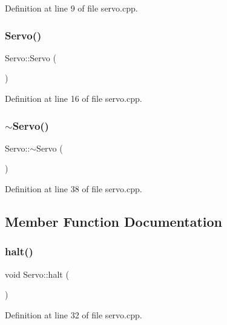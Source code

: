 Definition at line 9 of file servo.\+cpp.

\mbox{\label{class_servo_a70b2b17657cf258cdcb57503bcf62cd2}} 
\subsubsection{\texorpdfstring{Servo()}{Servo()}\hspace{0.1cm}{\footnotesize\ttfamily [2/2]}}
{\footnotesize\ttfamily Servo\+::\+Servo (\begin{DoxyParamCaption}{ }\end{DoxyParamCaption})}



Definition at line 16 of file servo.\+cpp.

\mbox{\label{class_servo_acb51bf4d970b071741ba76349a431fb0}} 
\subsubsection{\texorpdfstring{$\sim$\+Servo()}{~Servo()}}
{\footnotesize\ttfamily Servo\+::$\sim$\+Servo (\begin{DoxyParamCaption}{ }\end{DoxyParamCaption})}



Definition at line 38 of file servo.\+cpp.



\subsection{Member Function Documentation}
\mbox{\label{class_servo_a2219362602b79927b5fbd6343799f217}} 
\subsubsection{\texorpdfstring{halt()}{halt()}}
{\footnotesize\ttfamily void Servo\+::halt (\begin{DoxyParamCaption}{ }\end{DoxyParamCaption})}



Definition at line 32 of file servo.\+cpp.

